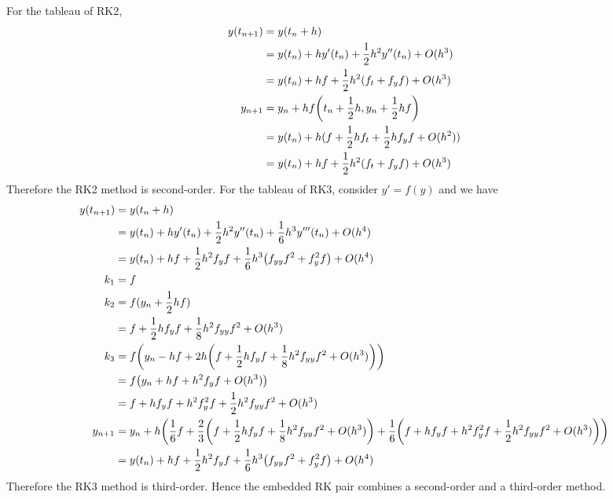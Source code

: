 \documentclass[10pt]{report}
\DeclarePairedDelimiter\autoparen{(}{)}
\newcommand{\pa}[1]{\autoparen*{#1}}
\begin{document}
\begin{enumerate}
	For the tableau of RK2,
	\begin{align*}
		y(t_{n+1})
		&= y(t_n + h)\\
		&= y(t_n) + hy'(t_n) + \frac{1}{2}h^2y''(t_n) + O(h^3)\\
		&= y(t_n) + hf + \frac{1}{2}h^2(f_t + f_y f) + O(h^3)\\
		y_{n+1} 
		&= y_n + hf\pa{t_n + \frac{1}{2}h, y_n + \frac{1}{2}hf}\\
		&= y(t_n) + h(f + \frac{1}{2}hf_t + \frac{1}{2}hf_yf + O(h^2))\\
		&= y(t_n) + hf + \frac{1}{2}h^2(f_t + f_y f) + O(h^3)
	\end{align*}
	Therefore the RK2 method is second-order.
	For the tableau of RK3, consider $y'=f(y)$ and we have
	\begin{align*}
	y(t_{n+1})
	&= y(t_n + h)\\
	&= y(t_n) + hy'(t_n) + \frac{1}{2}h^2y''(t_n) + \frac{1}{6}h^3y'''(t_n) + O(h^4)\\
	&= y(t_n) + hf + \frac{1}{2}h^2f_y f + \frac{1}{6}h^3\pa{f_{yy}f^2 + f_y^2f} + O(h^4)\\
	k_1 
	&= f\\
	k_2
	&= f(y_n + \frac{1}{2}hf)\\
	&= f + \frac{1}{2}h f_y f + \frac{1}{8}h^2 f_{yy} f^2 + O(h^3)\\
	k_3
	&= f\pa{y_n - hf + 2h\pa{f + \frac{1}{2}h f_y f + \frac{1}{8}h^2 f_{yy} f^2 + O(h^3)}}\\
	&= f\pa{y_n + hf + h^2f_yf + O(h^3)}\\
	&= f+hf_yf + h^2 f_y^2 f + \frac{1}{2}h^2 f_{yy}f^2 + O(h^3)\\
	y_{n+1}
	&= y_n + h\pa{\frac{1}{6}f + \frac{2}{3}\pa{f + \frac{1}{2}h f_y f + \frac{1}{8}h^2 f_{yy} f^2 + O(h^3)} + \frac{1}{6}\pa{f+hf_yf + h^2 f_y^2 f + \frac{1}{2}h^2 f_{yy}f^2 + O(h^3)}}\\
	&= y(t_n) + hf + \frac{1}{2}h^2f_y f + \frac{1}{6}h^3\pa{f_{yy}f^2 + f_y^2f} + O(h^4)
	\end{align*}
	Therefore the RK3 method is third-order. Hence the embedded RK pair combines a second-order and a third-order method.
\end{enumerate}
\end{document}
